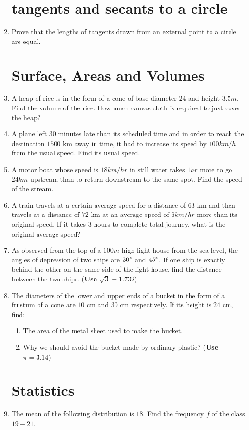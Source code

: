 \documentclass{article}
\begin{document}
\begin{enumerate}
\section{tangents and secants to a circle}
	\item Prove that the lengths of tangents drawn from an external point to a circle are equal.
\section{Surface, Areas and Volumes}
	\item A heap of rice is in the form of a cone of base diameter $24$ and height $3.5 m$. Find the volume of the rice. How much canvas cloth is required to just cover the heap?
	\item A plane left $30$ minutes late than its scheduled time and in order to reach the destination $1500$ km away in time, it had to increase  its speed by $100 km/h$ from the usual speed. Find its usual speed.
	\item A motor boat whose speed is $18  km/hr$ in still water takes $1hr$ more to go $24 km$ upstream than to return downstream to the same spot. Find the speed of the stream.
		\item A train travels at a certain average speed for a distance of $63$ km and then travels at a distance of $72$ km at an average speed of $6 km/hr$ more than its original speed. If it takes $3$ hours to complete total journey, what is the original average speed?
		\item As observed from the top of a $100 m$ high light house from the sea level, the angles of depression of two ships are $30\degree$ and $45\degree$. If one ship is exactly behind the other on the same side of the light house, find the distance between the two ships. ({\textbf{Use}} $\sqrt3 = 1.732$)
		\item The diameters of the lower and upper ends of a bucket in the form of a frustum of a cone are $10$ cm and $30$ cm respectively. If its height is $24$ cm, find:
			\begin{enumerate}[label=(\roman*)]	
				\item The area of the metal sheet used to make the bucket.
				\item Why we should avoid the bucket made by ordinary plastic? ({\textbf{Use}} $\pi = 3.14 $)

\end{enumerate}
	\section{Statistics}
\item The mean of the following distribution is $18$. Find the frequency $f$ of the class $19-21$.\\


\end{enumerate}
\end{document}
